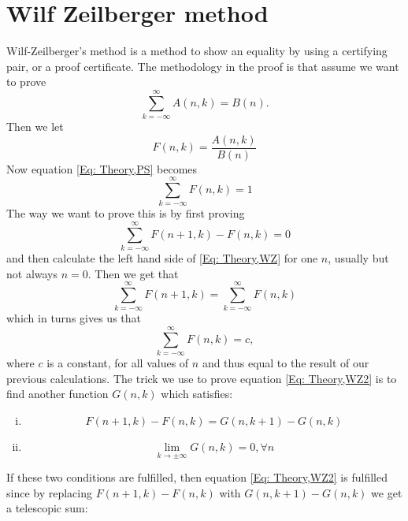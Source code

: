 \section{Wilf Zeilberger method}
Wilf-Zeilberger's method is a method to show an equality by using a certifying pair, or a proof certificate. The methodology in the proof  is that assume we want to prove %
\begin{equation}\label{Eq: Theory,PS}
  \sum_{k=-\infty}^\infty A(n,k) = B(n).
\end{equation}
Then we let
\begin{equation}
  F(n,k)=\frac{A(n,k)}{B(n)}
\end{equation}
Now equation \ref{Eq: Theory,PS} becomes
\begin{equation}\label{Eq: Theory,WZ}
  \sum_{k=-\infty}^\infty F(n,k) = 1
\end{equation}
The way we want to prove this is by first proving
\begin{equation}\label{Eq: Theory,WZ2}
  \sum_{k=-\infty}^\infty F(n+1,k)-F(n,k) = 0
\end{equation}
and then calculate the left hand side of \ref{Eq: Theory,WZ} for one $n$, usually but not always $n=0$. Then we get that
\begin{equation}
  \sum_{k=-\infty}^\infty F(n+1,k)=\sum_{k=-\infty}^\infty F(n,k)
\end{equation}
which in turns gives us that
\begin{equation}
  \sum_{k=-\infty}^\infty F(n,k) = c,
\end{equation}
where $c$ is a constant, for all values of $n$ and thus equal to the result of our previous calculations. The trick we use to prove equation \ref{Eq: Theory,WZ2} is to find another function $G(n,k)$ which satisfies:
\begin{enumerate}[i)]
  \item
  \begin{equation}\label{Eq: Theory,first condition}
    F(n+1,k)-F(n,k)=G(n,k+1)-G(n,k)
  \end{equation}
  \item
  \begin{equation}\label{Eq: Theory,second condition}
    \lim_{k\to\pm\infty}G(n,k)=0, \forall n
  \end{equation}
\end{enumerate}
If these two conditions are fulfilled, then equation \ref{Eq: Theory,WZ2} is fulfilled since by replacing $F(n+1,k)-F(n,k)$ with $G(n,k+1)-G(n,k)$ we get a telescopic sum:
